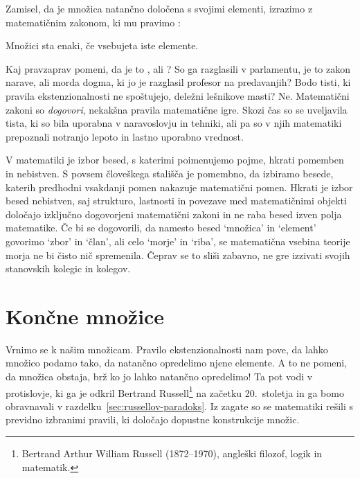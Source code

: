 Zamisel, da je množica natančno določena s svojimi elementi, izrazimo z matematičnim
zakonom, ki mu pravimo :

\begin{pravilo}
  Množici sta enaki, če vsebujeta iste elemente.
\end{pravilo}

Kaj pravzaprav pomeni, da je to ,  ali ? So ga
razglasili v parlamentu, je to zakon narave, ali morda dogma, ki jo je razglasil profesor
na predavanjih? Bodo tisti, ki pravila ekstenzionalnosti ne spoštujejo, deležni lešnikove
masti? Ne. Matematični zakoni so \emph{dogovori}, nekakšna pravila matematične igre. Skozi
čas so se uveljavila tista, ki so bila uporabna v naravoslovju in tehniki, ali pa so v njih
matematiki prepoznali notranjo lepoto in lastno uporabno vrednost.

V matematiki je izbor besed, s katerimi poimenujemo pojme, hkrati pomemben in nebistven.
%
S povsem človeškega stališča je pomembno, da izbiramo besede, katerih predhodni vsakdanji pomen nakazuje matematični pomen.
%
Hkrati je izbor besed nebistven, saj strukturo, lastnosti in povezave med
matematičnimi objekti določajo izključno dogovorjeni matematični zakoni in ne raba besed izven polja matematike.
%
Če bi se dogovorili, da namesto besed  `množica' in `element' govorimo `zbor' in `član', ali celo `morje' in `riba', se matematična vsebina teorije morja ne bi čisto nič spremenila.
%
Čeprav se to sliši zabavno, ne gre izzivati svojih stanovskih kolegic in kolegov.

\section{Končne množice}
\label{sec:koncne-mnozice}

Vrnimo se k našim množicam. Pravilo ekstenzionalnosti nam pove, da lahko množico podamo
tako, da natančno opredelimo njene elemente. A to ne pomeni, da množica obstaja, brž ko jo
lahko natančno opredelimo! Ta  pot vodi v protislovje, ki ga je odkril Bertrand Russell\footnote{Bertrand Arthur William Russell (1872--1970), angleški filozof, logik in matematik.} na začetku 20.~stoletja in ga bomo obravnavali v razdelku~\ref{sec:russellov-paradoks}.
Iz zagate so se matematiki rešili s previdno izbranimi pravili, ki določajo dopustne konstrukcije množic.


